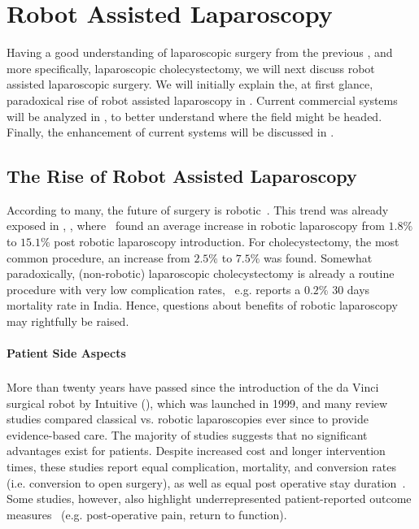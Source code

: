 \section{Robot Assisted Laparoscopy}
\label{in:sec:robot_assisted_laparoscopy}
Having a good understanding of laparoscopic surgery from the previous , and more specifically, laparoscopic cholecystectomy, we will next discuss robot assisted laparoscopic surgery. We will initially explain the, at first glance, paradoxical rise of robot assisted laparoscopy in . Current commercial systems will be analyzed in , to better understand where the field might be headed. Finally, the enhancement of current systems will be discussed in .

\subsection{The Rise of Robot Assisted Laparoscopy}
\label{in:sec:the_rise_of_robot_assisted_laparoscopy}
According to many, the future of surgery is robotic~\cite{times2021better}. This trend was already exposed in , , where~\cite{sheetz2020trends} found an average increase in robotic laparoscopy from $1.8\%$ to $15.1\%$ post robotic laparoscopy introduction. For cholecystectomy, the most common procedure, an increase from $2.5\%$ to $7.5\%$ was found. Somewhat paradoxically, (non-robotic) laparoscopic cholecystectomy is already a routine procedure with very low complication rates,~\cite{thapar2023evaluation} e.g. reports a $0.2\%$ 30 days mortality rate in India. Hence, questions about benefits of robotic laparoscopy may rightfully be raised.

\paragraph{Patient Side Aspects} More than twenty years have passed since the introduction of the da Vinci\textsuperscript{\textregistered} surgical robot by Intuitive (), which was launched in 1999, and many review studies compared classical vs. robotic laparoscopies ever since to provide evidence-based care. The majority of studies suggests that no significant advantages exist for patients. Despite increased cost and longer intervention times, these studies report equal complication, mortality, and conversion rates (i.e. conversion to open surgery), as well as equal post operative stay duration~\cite{kawka2023laparoscopic, csirzo2023robot}. Some studies, however, also highlight underrepresented patient-reported outcome measures~\cite{kawka2023laparoscopic} (e.g. post-operative pain, return to function). 

